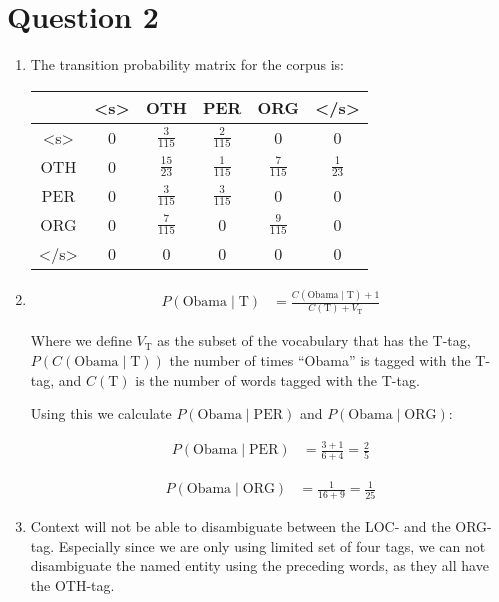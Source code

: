 \documentclass[a4paper]{article}
\begin{document}
\section*{Question 2}
\begin{enumerate}
    \item The transition probability matrix for the corpus is:

        \begin{tabular}{c|ccccc}
            & <s> & OTH & PER & ORG & </s>\\\hline
            <s>& 0&$\frac{3}{115}$&$\frac{2}{115}$&0&0\\
            OTH& 0&$\frac{15}{23}$&$\frac{1}{115}$&$\frac{7}{115}$&$\frac{1}{23}$\\
            PER& 0&$\frac{3}{115}$&$\frac{3}{115}$&0&0\\
            ORG& 0&$\frac{7}{115}$&0&$\frac{9}{115}$&0\\
            </s>&0&0&0&0&0\\
        \end{tabular}

    \item

        \begin{align}
            P(\text{Obama}\mid\text{T}) &= \frac{C(\text{Obama} \mid
            \text{T}) + 1}{C(\text{T}) + V_{\text{T}}}
        \end{align}

        Where we define $V_{\text{T}}$ as the subset of the vocabulary that has
        the T-tag, $P(C(\text{Obama}\mid\text{T}))$ the number of times
        ``Obama'' is tagged with the T-tag, and $C(\text{T})$ is the number of
        words tagged with the T-tag.

        Using this we calculate  $P(\text{Obama}\mid\text{PER})$ and $P(\text{Obama}\mid\text{ORG})$:

        \begin{align}
            P(\text{Obama}\mid\text{PER}) &=\frac{3+1}{6+4} = \frac{2}{5}
        \end{align}


        \begin{align}
            P(\text{Obama}\mid\text{ORG}) &=\frac{1}{16+9} = \frac{1}{25}
        \end{align}

    \item Context will not be able to disambiguate between the LOC- and the
        ORG-tag. Especially since we are only using limited set of four tags, we
        can not disambiguate the named entity using the preceding words, as they
        all have the OTH-tag.


\end{enumerate}
\end{document}

